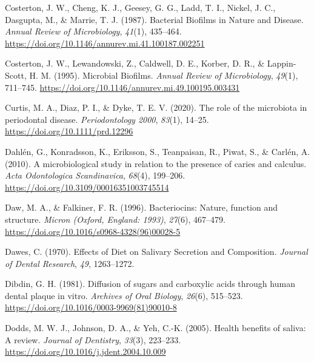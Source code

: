 \documentclass[
  b5paper,
]{book}
\newlength{\cslhangindent}
\newlength{\cslentryspacingunit} %
\newenvironment{CSLReferences}[2] %
 {%
  \setlength{\parindent}{0pt}
  \ifodd #1
  \let\oldpar\par
  \def\par{\hangindent=\cslhangindent\oldpar}
  \fi
  \setlength{\parskip}{#2\cslentryspacingunit}
 }%
 {}
\begin{document}
\begin{CSLReferences}{1}{0}
\leavevmode{}%
Costerton, J. W., Cheng, K. J., Geesey, G. G., Ladd, T. I., Nickel, J.
C., Dasgupta, M., \& Marrie, T. J. (1987). Bacterial {Biofilms} in
{Nature} and {Disease}. \emph{Annual Review of Microbiology},
\emph{41}(1), 435--464.
\url{https://doi.org/10.1146/annurev.mi.41.100187.002251}

\leavevmode{}%
Costerton, J. W., Lewandowski, Z., Caldwell, D. E., Korber, D. R., \&
Lappin-Scott, H. M. (1995). Microbial {Biofilms}. \emph{Annual Review of
Microbiology}, \emph{49}(1), 711--745.
\url{https://doi.org/10.1146/annurev.mi.49.100195.003431}

\leavevmode{}%
Curtis, M. A., Diaz, P. I., \& Dyke, T. E. V. (2020). The role of the
microbiota in periodontal disease. \emph{Periodontology 2000},
\emph{83}(1), 14--25. \url{https://doi.org/10.1111/prd.12296}

\leavevmode{}%
Dahlén, G., Konradsson, K., Eriksson, S., Teanpaisan, R., Piwat, S., \&
Carlén, A. (2010). A microbiological study in relation to the presence
of caries and calculus. \emph{Acta Odontologica Scandinavica},
\emph{68}(4), 199--206. \url{https://doi.org/10.3109/00016351003745514}

\leavevmode{}%
Daw, M. A., \& Falkiner, F. R. (1996). Bacteriocins: Nature, function
and structure. \emph{Micron (Oxford, England: 1993)}, \emph{27}(6),
467--479. \url{https://doi.org/10.1016/s0968-4328(96)00028-5}

\leavevmode{}%
Dawes, C. (1970). Effects of {Diet} on {Salivary Secretion} and
{Composition}. \emph{Journal of Dental Research}, \emph{49}, 1263--1272.

\leavevmode{}%
Dibdin, G. H. (1981). Diffusion of sugars and carboxylic acids through
human dental plaque in vitro. \emph{Archives of Oral Biology},
\emph{26}(6), 515--523.
\url{https://doi.org/10.1016/0003-9969(81)90010-8}

\leavevmode{}%
Dodds, M. W. J., Johnson, D. A., \& Yeh, C.-K. (2005). Health benefits
of saliva: A review. \emph{Journal of Dentistry}, \emph{33}(3),
223--233. \url{https://doi.org/10.1016/j.jdent.2004.10.009}


\end{CSLReferences}
\end{document}
